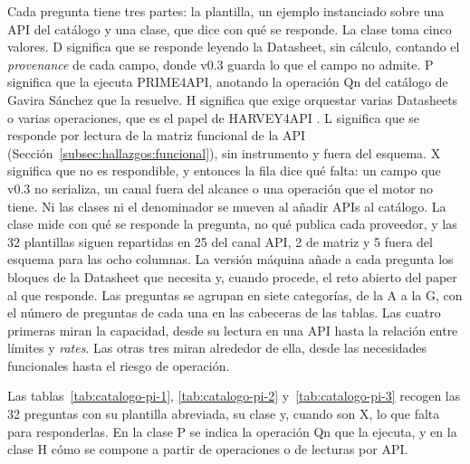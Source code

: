 Cada pregunta tiene tres partes: la plantilla, un ejemplo instanciado sobre una API del
catálogo y una clase, que dice con qué se responde. La clase toma cinco valores. D significa que se responde leyendo la Datasheet, sin
cálculo, contando el \textit{provenance} de cada campo, donde v0.3 guarda lo que el
campo no admite. P significa que la ejecuta PRIME4API, anotando la operación Qn del
catálogo de Gavira Sánchez \citep{gavira2026tfm} que la resuelve. H significa que
exige orquestar varias Datasheets o varias operaciones, que es el papel de HARVEY4API
\citep{ruizlopez2026tfm}. L significa que se responde por lectura de la matriz
funcional de la API (Sección~\ref{subsec:hallazgos:funcional}), sin instrumento y fuera
del esquema. X significa que no es respondible, y entonces la fila
dice qué falta: un campo que v0.3 no serializa, un canal fuera del alcance o una
operación que el motor no tiene. Ni las clases ni el denominador se mueven al añadir
APIs al catálogo. La clase mide con qué se responde la pregunta, no qué publica cada
proveedor, y las 32 plantillas siguen repartidas en 25 del canal API, 2 de matriz y 5
fuera del esquema para las ocho columnas.
La versión máquina añade a cada pregunta los bloques
de la Datasheet que necesita y, cuando procede, el reto abierto del paper al que
responde. Las preguntas se agrupan en siete categorías, de la A a la G, con el número
de preguntas de cada una en las cabeceras de las tablas. Las cuatro primeras miran la
capacidad, desde su lectura en una API hasta la relación entre límites y
\textit{rates}. Las otras tres miran alrededor de ella, desde las necesidades
funcionales hasta el riesgo de operación.

Las tablas~\ref{tab:catalogo-pi-1}, \ref{tab:catalogo-pi-2} y~\ref{tab:catalogo-pi-3}
recogen las 32 preguntas
con su plantilla abreviada, su clase y, cuando son X, lo que falta para responderlas.
En la clase P se indica la operación Qn que la ejecuta, y en la clase H cómo se compone
a partir de operaciones o de lecturas por API.

